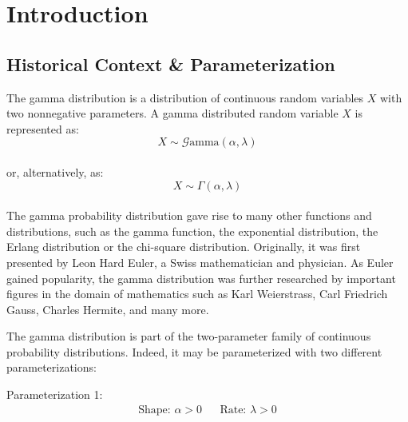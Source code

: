 \documentclass[12pt]{article}
\newcommand{\G}{\mathcal{G}}
\begin{document}
\singlespacing

\tableofcontents\pagebreak
\doublespacing
\section{Introduction}\vspace*{-24pt}
\subsection{Historical Context \& Parameterization}
The gamma distribution\cite{carrierProbabilityStatistics201BNM05} is a distribution of continuous random variables $X$
with two nonnegative parameters. A gamma distributed random variable $X$ is represented as:
\vspace*{-24pt}
\begin{equation*}
	X\sim\G\text{amma}(\alpha, \lambda)
\end{equation*}\\[-50pt]
or, alternatively, as:\vspace*{-6pt}
\begin{equation*}
	X\sim\Gamma(\alpha,\lambda)
\end{equation*}\\[-60pt]

The gamma probability distribution gave rise to many other functions and distributions, such as the gamma function, the
exponential distribution, the Erlang distribution or the chi-square distribution. Originally, it was first presented by
Leon Hard Euler, a Swiss mathematician and physician. As Euler gained popularity, the gamma distribution was further
researched by important figures in the domain of mathematics such as Karl Weierstrass, Carl Friedrich Gauss, Charles
Hermite, and many more\cite{hoschGammaDistribution2017, wikipediaGammaDistribution2022,
sebahIntroductionGammaFunction2002}.

The gamma distribution is part of the two-parameter family of continuous probability distributions. Indeed, it may be
parameterized with two different parameterizations\cite{wikipediaGammaDistribution2022}:

\noindent Parameterization 1:\vspace*{-24pt}
\begin{align*}
	\text{Shape: } \alpha>0		&&	\text{Rate: }\lambda>0
\end{align*}\\[-60pt]
\end{document}
